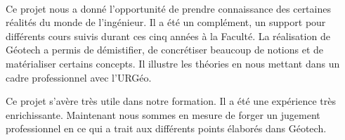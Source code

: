 \paragraph{}
Ce projet nous a donné l'opportunité de prendre connaissance des certaines réalités du monde
de l'ingénieur. Il a été un complément, un support pour différents cours suivis durant ces cinq années
à la Faculté. La réalisation de Géotech a permis de démistifier, de concrétiser
beaucoup de notions et de matérialiser certains concepts. Il illustre les théories en nous mettant 
dans un cadre professionnel avec l'URGéo.

\par
Ce projet s'avère très utile dans notre formation. Il a été
une expérience très enrichissante.
Maintenant nous sommes en mesure de forger un jugement  professionnel en ce qui a trait aux différents points 
élaborés dans Géotech.